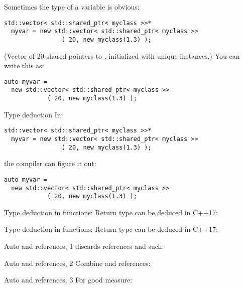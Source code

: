 Sometimes the type of a variable is obvious:
\begin{verbatim}
std::vector< std::shared_ptr< myclass >>*
  myvar = new std::vector< std::shared_ptr< myclass >>
                ( 20, new myclass(1.3) );
\end{verbatim}
(Vector of 20 shared pointers to , initialized with unique instances.)
You can write this as:
\begin{verbatim}
auto myvar =
  new std::vector< std::shared_ptr< myclass >>
            ( 20, new myclass(1.3) );
\end{verbatim}

\begin{slide}{Type deduction}
  \label{sl:auto-deduct}
In:
\begin{verbatim}
std::vector< std::shared_ptr< myclass >>*
  myvar = new std::vector< std::shared_ptr< myclass >>
                ( 20, new myclass(1.3) );
\end{verbatim}
the compiler can figure it out:
\begin{verbatim}
auto myvar =
  new std::vector< std::shared_ptr< myclass >>
            ( 20, new myclass(1.3) );
\end{verbatim}
\end{slide}

\begin{block}{Type deduction in functions}:
  \label{sl:auto-fun}
  Return type can be deduced in C++17:
\end{block}

\begin{block}{Type deduction in functions}:
  \label{sl:auto-method}
  Return type can be deduced in C++17:
\end{block}

\begin{block}{Auto and references, 1}
  \label{sl:auto-ref1}
   discards references and such:
\end{block}

\begin{block}{Auto and references, 2}
  \label{sl:auto-ref2}
  Combine  and references:
\end{block}

\begin{block}{Auto and references, 3}
  \label{sl:auto-ref3}
  For good measure:
\end{block}

